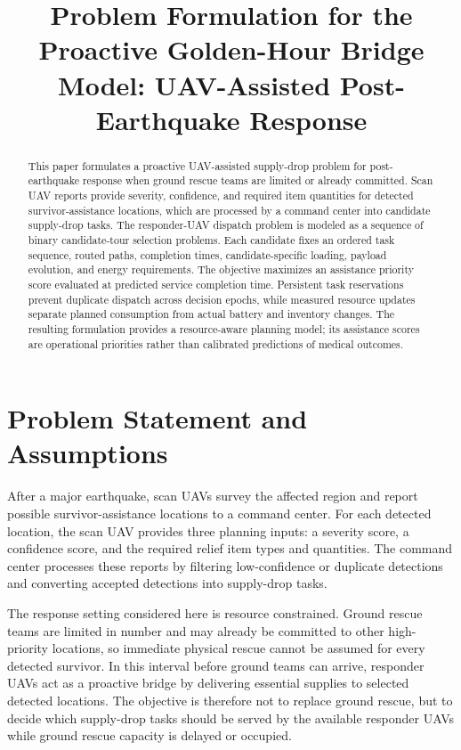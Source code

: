 \documentclass[conference]{IEEEtran}
\title{Problem Formulation for the Proactive Golden-Hour Bridge Model: UAV-Assisted Post-Earthquake Response}
\author{\IEEEauthorblockN{Working Thesis Draft}}
\begin{document}
\maketitle
\begin{abstract}
This paper formulates a proactive UAV-assisted supply-drop problem for post-earthquake response when ground rescue teams are limited or already committed. Scan UAV reports provide severity, confidence, and required item quantities for detected survivor-assistance locations, which are processed by a command center into candidate supply-drop tasks. The responder-UAV dispatch problem is modeled as a sequence of binary candidate-tour selection problems. Each candidate fixes an ordered task sequence, routed paths, completion times, candidate-specific loading, payload evolution, and energy requirements. The objective maximizes an assistance priority score evaluated at predicted service completion time. Persistent task reservations prevent duplicate dispatch across decision epochs, while measured resource updates separate planned consumption from actual battery and inventory changes. The resulting formulation provides a resource-aware planning model; its assistance scores are operational priorities rather than calibrated predictions of medical outcomes.
\end{abstract}

\section{Problem Statement and Assumptions}
After a major earthquake, scan UAVs survey the affected region and report possible survivor-assistance locations to a command center. For each detected location, the scan UAV provides three planning inputs: a severity score, a confidence score, and the required relief item types and quantities. The command center processes these reports by filtering low-confidence or duplicate detections and converting accepted detections into supply-drop tasks.

The response setting considered here is resource constrained. Ground rescue teams are limited in number and may already be committed to other high-priority locations, so immediate physical rescue cannot be assumed for every detected survivor. In this interval before ground teams can arrive, responder UAVs act as a proactive bridge by delivering essential supplies to selected detected locations. The objective is therefore not to replace ground rescue, but to decide which supply-drop tasks should be served by the available responder UAVs while ground rescue capacity is delayed or occupied.
\end{document}
